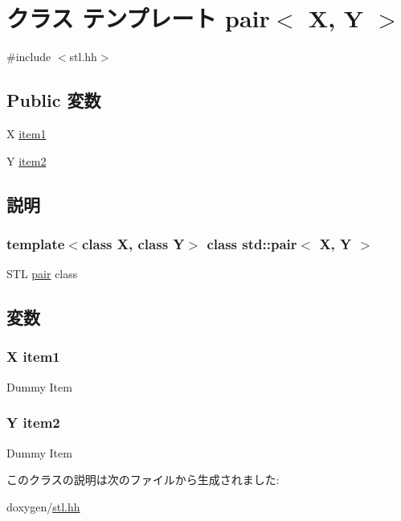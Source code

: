 \hypertarget{classstd_1_1pair}{
\section{クラス テンプレート pair$<$ X, Y $>$}
\label{classstd_1_1pair}
}


{\ttfamily \#include $<$stl.hh$>$}\subsection*{Public 変数}
\begin{DoxyCompactItemize}
\item 
X \hyperlink{classstd_1_1pair_a3b628688bdc745ae5e8f9efc04ea337d}{item1}
\item 
Y \hyperlink{classstd_1_1pair_a80f1568dec5020036871e0490d193704}{item2}
\end{DoxyCompactItemize}


\subsection{説明}
\subsubsection*{template$<$class X, class Y$>$ class std::pair$<$ X, Y $>$}

STL \hyperlink{classstd_1_1pair}{pair} class 

\subsection{変数}
\hypertarget{classstd_1_1pair_a3b628688bdc745ae5e8f9efc04ea337d}{
\subsubsection[{item1}]{\setlength{\rightskip}{0pt plus 5cm}X {\bf item1}}}
\label{classstd_1_1pair_a3b628688bdc745ae5e8f9efc04ea337d}
Dummy Item \hypertarget{classstd_1_1pair_a80f1568dec5020036871e0490d193704}{
\subsubsection[{item2}]{\setlength{\rightskip}{0pt plus 5cm}Y {\bf item2}}}
\label{classstd_1_1pair_a80f1568dec5020036871e0490d193704}
Dummy Item 

このクラスの説明は次のファイルから生成されました:\begin{DoxyCompactItemize}
\item 
doxygen/\hyperlink{stl_8hh}{stl.hh}\end{DoxyCompactItemize}
